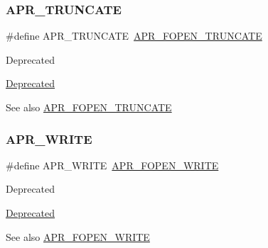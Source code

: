 \subsubsection{\texorpdfstring{A\+P\+R\+\_\+\+T\+R\+U\+N\+C\+A\+TE}{APR\_TRUNCATE}}
{\footnotesize\ttfamily \#define A\+P\+R\+\_\+\+T\+R\+U\+N\+C\+A\+TE~\mbox{\hyperlink{group__apr__file__open__flags_ga09b05a5bd5db534b93794f7657bcb146}{A\+P\+R\+\_\+\+F\+O\+P\+E\+N\+\_\+\+T\+R\+U\+N\+C\+A\+TE}}}

\begin{DoxyRefDesc}{Deprecated}
\item[\mbox{\hyperlink{deprecated__deprecated000021}{Deprecated}}]\end{DoxyRefDesc}
\begin{DoxySeeAlso}{See also}
\mbox{\hyperlink{group__apr__file__open__flags_ga09b05a5bd5db534b93794f7657bcb146}{A\+P\+R\+\_\+\+F\+O\+P\+E\+N\+\_\+\+T\+R\+U\+N\+C\+A\+TE}} 
\end{DoxySeeAlso}
\mbox{\label{group__apr__file__open__flags_ga3e427e53aceb1ccdb078d9a03cd63d01}} 
\subsubsection{\texorpdfstring{A\+P\+R\+\_\+\+W\+R\+I\+TE}{APR\_WRITE}}
{\footnotesize\ttfamily \#define A\+P\+R\+\_\+\+W\+R\+I\+TE~\mbox{\hyperlink{group__apr__file__open__flags_gac598bb95fc9476b0bf2ed0b1c308842c}{A\+P\+R\+\_\+\+F\+O\+P\+E\+N\+\_\+\+W\+R\+I\+TE}}}

\begin{DoxyRefDesc}{Deprecated}
\item[\mbox{\hyperlink{deprecated__deprecated000018}{Deprecated}}]\end{DoxyRefDesc}
\begin{DoxySeeAlso}{See also}
\mbox{\hyperlink{group__apr__file__open__flags_gac598bb95fc9476b0bf2ed0b1c308842c}{A\+P\+R\+\_\+\+F\+O\+P\+E\+N\+\_\+\+W\+R\+I\+TE}} 
\end{DoxySeeAlso}
\mbox{\label{group__apr__file__open__flags_gaa9120c0e395d8a0e640b5eafa8f11cce}} 
